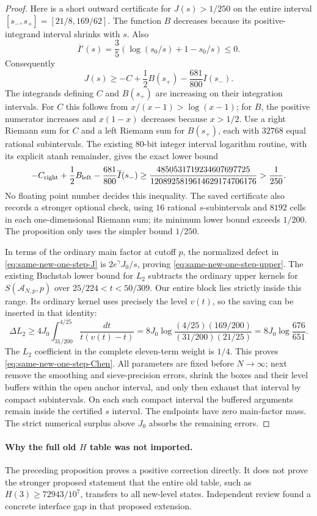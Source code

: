 \documentclass[11pt]{article}
\begin{document}
\begin{proof}
Here is a short outward certificate for $J(s)>1/250$ on the entire
interval $[s_-,s_+]=[21/8,169/62]$. The function $B$ decreases because
its positive-integrand interval shrinks with $s$. Also
\[
 \overline I'(s)=\frac35\left(\log(s_0/s)+1-s_0/s\right)\le0.
\]
Consequently
\[
 J(s)\ge-C+\frac12B(s_+)-\frac{681}{800}\overline I(s_-).
\]
The integrands defining $C$ and $B(s_+)$ are increasing on their
integration intervals. For $C$ this follows from
$x/(x-1)>\log(x-1)$; for $B$, the positive numerator increases and
$x(1-x)$ decreases because $x>1/2$.
Use a right Riemann sum for $C$ and a left Riemann sum for $B(s_+)$,
each with $32768$ equal rational subintervals.
The existing $80$-bit integer interval logarithm routine, with its
explicit atanh remainder, gives the exact lower bound
\[
 -C_{\rm right}+\frac12B_{\rm left}
       -\frac{681}{800}\overline I(s_-)
 \ge
 \frac{4850531719234607697725}{1208925819614629174706176}
 >\frac1{250}.
\]
No floating point number decides this inequality. The saved certificate
also records a stronger optional check, using $16$ rational
$s$-subintervals and $8192$ cells in each one-dimensional Riemann sum;
its minimum lower bound exceeds $1/200$. The proposition only uses
the simpler bound $1/250$.

In terms of the ordinary main factor at cutoff $p$, the normalized
defect in \eqref{eq:same-new-one-step-J} is
$2e^\gamma J_0/s$, proving \eqref{eq:same-new-one-step-upper}.
The existing Buchstab lower bound for $L_2$ subtracts the ordinary
upper kernels for $S(\mathcal A_{N,p},p)$ over
$25/224<t<50/309$. Our entire block lies strictly inside this range.
Its ordinary kernel uses precisely the level $v(t)$, so the saving
can be inserted in that identity:
\[
 \Delta L_2\ge
 4J_0\int_{31/200}^{4/25}\frac{dt}{t(v(t)-t)}
 =8J_0\log\frac{(4/25)(169/200)}{(31/200)(21/25)}
 =8J_0\log\frac{676}{651}.
\]
The $L_2$ coefficient in the complete eleven-term weight is $1/4$.
This proves \eqref{eq:same-new-one-step-Chen}.
All parameters are fixed before $N\to\infty$; next remove the
smoothing and sieve-precision errors, shrink the boxes and their
level buffers within the open anchor interval, and only then exhaust
that interval by compact subintervals. On each such compact interval
the buffered arguments remain inside the certified $s$ interval.
The endpoints have zero main-factor mass. The strict numerical
surplus above $J_0$ absorbs the remaining errors.
\end{proof}

\paragraph{Why the full old $H$ table was not imported.}
The preceding proposition proves a positive correction directly.
It does not prove the stronger proposed statement that the entire
old table, such as $H(3)\ge72943/10^7$, transfers to all new-level
states. Independent review found a concrete interface gap in that
proposed extension.
\end{document}
